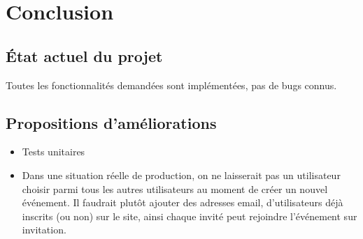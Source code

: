 \documentclass[a4paper, 12pt]{article}
\begin{document}
\newpage

\section{Conclusion}
\subsection{État actuel du projet}
Toutes les fonctionnalités demandées sont implémentées, pas de bugs connus.

\subsection{Propositions d'améliorations}
\begin{itemize}
	\item Tests unitaires
	\item Dans une situation réelle de production, on ne laisserait pas un utilisateur choisir parmi tous les 
	autres utilisateurs au moment de créer un nouvel événement. Il faudrait plutôt ajouter des adresses email, 
	d'utilisateurs déjà inscrits (ou non) sur le site, ainsi chaque invité peut rejoindre l'événement sur invitation.
\end{itemize}
\end{document}
